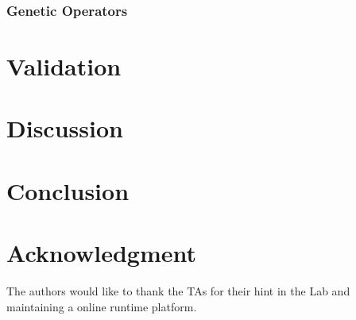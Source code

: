 \documentclass[conference]{IEEEtran}
\begin{document}
    \subsubsection{Genetic Operators}

\section{Validation}
	 
\section{Discussion}


\section{Conclusion}

\section*{Acknowledgment}

The authors would like to thank the TAs for their hint in the Lab and maintaining a online runtime platform. 







\end{document}
